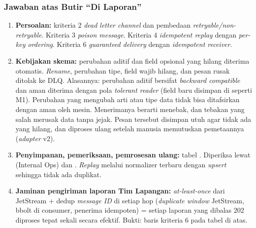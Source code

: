 \subsubsection{Jawaban atas Butir ``Di Laporan''}
\begin{enumerate}
\item \textbf{Persoalan:} kriteria 2 \textit{dead letter channel} dan pembedaan \textit{retryable/non-retryable}. Kriteria 3 \textit{poison message}. Kriteria 4 \textit{idempotent replay} dengan \textit{per-key ordering}. Kriteria 6 \textit{guaranteed delivery} dengan \textit{idempotent receiver}.
\item \textbf{Kebijakan skema:} perubahan aditif dan field opsional yang hilang diterima otomatis. \textit{Rename}, perubahan tipe, field wajib hilang, dan pesan rusak ditolak ke DLQ. Alasannya: perubahan aditif bersifat \textit{backward compatible} dan aman diterima dengan pola \textit{tolerant reader} (field baru disimpan di  seperti M1). Perubahan yang mengubah arti atau tipe data tidak bisa ditafsirkan dengan aman oleh mesin. Menerimanya berarti menebak, dan tebakan yang salah merusak data tanpa jejak. Pesan tersebut disimpan utuh agar tidak ada yang hilang, dan diproses ulang setelah manusia memutuskan pemetaannya (\textit{adapter} v2).
\item \textbf{Penyimpanan, pemeriksaan, pemrosesan ulang:} tabel . Diperiksa lewat  (Internal Ops) dan . \textit{Replay} melalui normalizer terbaru dengan \textit{upsert}  sehingga tidak ada duplikat.
\item \textbf{Jaminan pengiriman laporan Tim Lapangan:} \textit{at-least-once} dari JetStream + dedup \textit{message ID} di setiap hop (\textit{duplicate window} JetStream, bbolt di consumer, penerima idempoten) = setiap laporan yang dibalas 202 diproses tepat sekali secara efektif. Bukti: baris kriteria 6 pada tabel di atas.
\end{enumerate}
